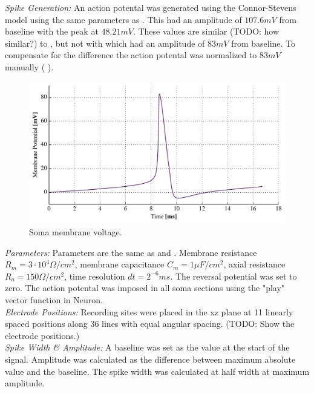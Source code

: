 \documentclass[altfont, fleqn]{uiophd}
\renewcommand{\cref}[1]{{\color{viridis_03}\mycref{#1}} }
\begin{document}
\noindent\emph{Spike Generation:}
An action potental was generated using the Connor-Stevens model 
\cites{connor_prediction_1971, connor_neural_1977}
using the same parameters as \textcite{dayan_theoretical_2001}. 
This had an amplitude of $107.6mV$ from baseline with the peak at $48.21mV$. 
These values are similar (TODO: how similar?) to \textcite{dayan_theoretical_2001}, but not
with \textcite{pettersen_amplitude_2008} which had an amplitude of 
$83mV$ from baseline. To compensate for the difference the action potental was 
normalized to $83mV$ manually (\cref{fig:3_1_soma_mem}).
\\

\begin{figure}[h]
\centering
\includegraphics[width=1\textwidth]{images/3_methods/3_1_reproduction/soma_mem.pdf}
\caption{Soma membrane voltage. }
\label{fig:3_1_soma_mem}
\end{figure}


\noindent\emph{Parameters:}
Parameters are the same as \textcite{pettersen_amplitude_2008} and 
\textcite{dayan_theoretical_2001} . Membrane resistance 
$R_m = 3\cdot10^4\Omega /cm^2$, membrane capacitance $C_m=1\mu F / cm^2$, 
axial resistance $R_a = 150\Omega/cm^2$, time resolution $dt=2^{-6}ms$. 
The reversal potential was set to zero. The action potental was imposed in all
soma sections using the "play" vector function in Neuron.
\\

\noindent\emph{Electrode Positions:}
Recording sites were placed in the xz plane at 11 linearly spaced 
positions along 36 lines with equal 
angular spacing. (TODO: Show the electrode positions.) 
\\


\noindent\emph{Spike Width \& Amplitude:}
A baseline was set as the value at the start of the signal. 
Amplitude was calculated as the difference between maximum absolute value and the
baseline.
The spike width was calculated at half width at maximum amplitude. 
\end{document}
